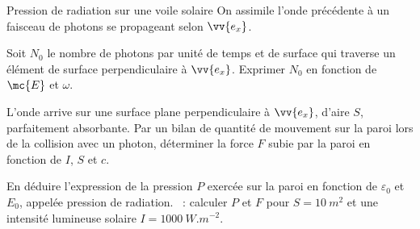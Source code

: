 \begin{exo}[PC][2][TD]{Pression de radiation sur une voile solaire}
On assimile l'onde précédente à un faisceau de photons se propageant selon $\vv{e_x}$.
\begin{quest}
\item Soit $N_0$ le nombre de photons par unité de temps et de surface qui traverse un élément de surface perpendiculaire à $\vv{e_x}$. Exprimer $N_0$ en fonction de $\mc{E}$ et $\omega$.
\item L'onde arrive sur une surface plane perpendiculaire à $\vv{e_x}$, d'aire $S$, parfaitement absorbante. Par un bilan de quantité de mouvement sur la paroi lors de la collision avec un photon, déterminer la force $F$ subie par la paroi en fonction de $I$, $S$ et $c$.
\item En déduire l'expression de la pression $P$ exercée sur la paroi en fonction de $\varepsilon_0$ et $E_0$, appelée pression de radiation. \AN~: calculer $P$ et $F$ pour $S=\SI{10}{m^2}$ et une intensité lumineuse solaire $I = \SI{1000}{W.m^{-2}}$.
\end{quest}
\end{exo}


